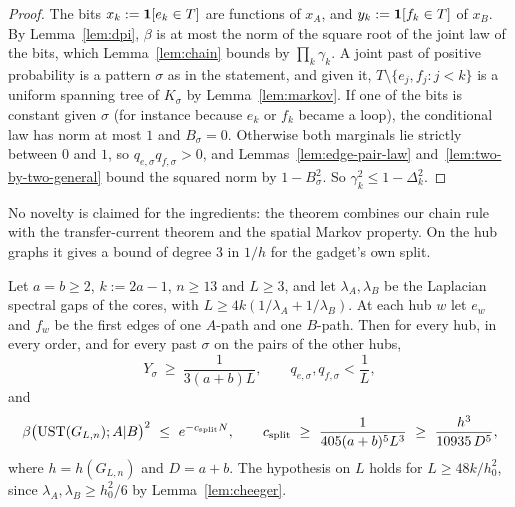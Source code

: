 \begin{proof}
The bits $x_k:=\mathbf{1}[e_k\in T]$ are functions of $x_A$, and $y_k:=\mathbf{1}[f_k\in T]$ of $x_B$. By Lemma~\ref{lem:dpi}, $\beta$ is at most the norm of the square root of the joint law of the bits, which Lemma~\ref{lem:chain} bounds by $\prod_k\gamma_k$. A joint past of positive probability is a pattern $\sigma$ as in the statement, and given it, $T\setminus\{e_j,f_j:j<k\}$ is a uniform spanning tree of $K_\sigma$ by Lemma~\ref{lem:markov}. If one of the bits is constant given $\sigma$ (for instance because $e_k$ or $f_k$ became a loop), the conditional law has norm at most $1$ and $B_\sigma=0$. Otherwise both marginals lie strictly between $0$ and $1$, so $q_{e,\sigma}q_{f,\sigma}>0$, and Lemmas~\ref{lem:edge-pair-law} and~\ref{lem:two-by-two-general} bound the squared norm by $1-B_\sigma^2$. So $\gamma_k^2\le1-\Delta_k^2$.
\end{proof}

No novelty is claimed for the ingredients: the theorem combines our chain rule with the transfer-current theorem and the spatial Markov property. On the hub graphs it gives a bound of degree $3$ in $1/h$ for the gadget's own split.

\begin{proposition}\label{prop:hub-pairs}
Let $a=b\ge2$, $k:=2a-1$, $n\ge13$ and $L\ge3$, and let $\lambda_A,\lambda_B$ be the Laplacian spectral gaps of the cores, with $L\ge4k(1/\lambda_A+1/\lambda_B)$. At each hub $w$ let $e_w$ and $f_w$ be the first edges of one $A$-path and one $B$-path. Then for every hub, in every order, and for every past $\sigma$ on the pairs of the other hubs,
\[
  Y_\sigma\ \ge\ \frac1{3(a+b)L},\qquad q_{e,\sigma},q_{f,\sigma}<\frac1L,
\]
and
\[
  \beta\bigl(\UST(G_{L,n});A|B\bigr)^2\ \le\ e^{-c_{\mathrm{split}}N},\qquad c_{\mathrm{split}}\ \ge\ \frac1{405(a+b)^5L^3}\ \ge\ \frac{h^3}{10935\,D^5},
\]
where $h=h(G_{L,n})$ and $D=a+b$. The hypothesis on $L$ holds for $L\ge48k/h_0^2$, since $\lambda_A,\lambda_B\ge h_0^2/6$ by Lemma~\ref{lem:cheeger}.
\end{proposition}

